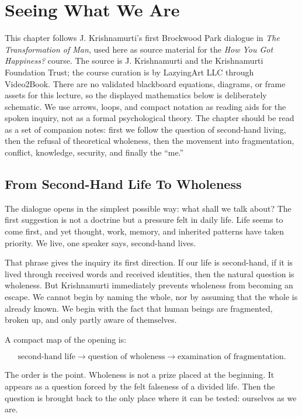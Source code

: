 \chapter{Seeing What We Are}

This chapter follows J. Krishnamurti's first Brockwood Park dialogue in \emph{The Transformation of Man}, used here as source material for the \emph{How You Got Happiness?} course. The source is J. Krishnamurti and the Krishnamurti Foundation Trust; the course curation is by LazyingArt LLC through Video2Book. There are no validated blackboard equations, diagrams, or frame assets for this lecture, so the displayed mathematics below is deliberately schematic. We use arrows, loops, and compact notation as reading aids for the spoken inquiry, not as a formal psychological theory. The chapter should be read as a set of companion notes: first we follow the question of second-hand living, then the refusal of theoretical wholeness, then the movement into fragmentation, conflict, knowledge, security, and finally the ``me.''

\section{From Second-Hand Life To Wholeness}

The dialogue opens in the simplest possible way: what shall we talk about? The first suggestion is not a doctrine but a pressure felt in daily life. Life seems to come first, and yet thought, work, memory, and inherited patterns have taken priority. We live, one speaker says, second-hand lives.

That phrase gives the inquiry its first direction. If our life is second-hand, if it is lived through received words and received identities, then the natural question is wholeness. But Krishnamurti immediately prevents wholeness from becoming an escape. We cannot begin by naming the whole, nor by assuming that the whole is already known. We begin with the fact that human beings are fragmented, broken up, and only partly aware of themselves.

A compact map of the opening is:

\begin{equation}
\text{second-hand life}
\longrightarrow
\text{question of wholeness}
\longrightarrow
\text{examination of fragmentation}.
\end{equation}

The order is the point. Wholeness is not a prize placed at the beginning. It appears as a question forced by the felt falseness of a divided life. Then the question is brought back to the only place where it can be tested: ourselves as we are.

